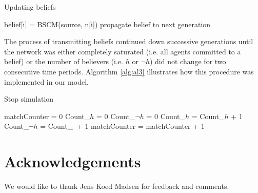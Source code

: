 \documentclass[fleqn,10pt]{wlscirep}
\begin{document}
\begin{algorithm}[H]
\caption{Updating beliefs}\label{update}
\begin{algorithmic}[1]
    
     \label{alg:al2}
             \State belief[i] = BSCM(source, n[i])
              \State propagate belief to next generation
              \EndIf
             \EndIf
        \EndFor
    \EndIf
  \EndProcedure
\end{algorithmic}
\end{algorithm}

The process of transmitting beliefs continued down successive generations until the network was either completely saturated (i.e. all agents committed to a belief) or the number of believers (i.e. \(h\) or \(\neg h\)) did not change for two consecutive time periods. Algorithm \ref{alg:al3} illustrates how this procedure was implemented in our model.

\begin{algorithm}[H]
\caption{Stop simulation}\label{proceed}
\begin{algorithmic}[1]
    \State matchCounter = 0 
    \State Count_{\(h\)} = 0
     \label{alg:al3}
    \State Count_{\(\neg h\)} = 0
            \State Count_{\(h\)} = Count_{\(h\)} + 1
        \EndIf
            \State Count_{\(\neg h\)} = Count_{\(\ \)} + 1
        \EndIf
    \EndFor
        \State matchCounter = matchCounter + 1
    \EndIf
  \EndProcedure
\end{algorithmic}
\end{algorithm}





\section*{Acknowledgements}
We would like to thank Jens Koed Madsen for feedback and comments. 
\end{document}
